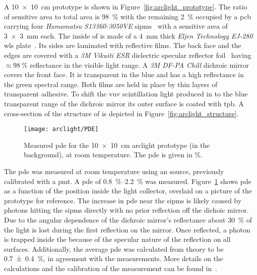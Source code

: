 A \SI{10 x 10}{\centi\metre} \AL{} prototype is shown in Figure~\ref{fig:arclight_prototype}.
The ratio of sensitive area to total area is \SI{98}{\percent} with the remaining \SI{2}{\percent} occupied by a \gls{pcb} carrying four \emph{Hamamatsu S13360-3050VE} \glspl{sipm}~\cite{arclight_sipm} with a sensitive area of \SI{3 x 3}{\milli\metre} each.
The inside of \AL{} is made of a \SI{4}{\milli\metre} thick \emph{Eljen Technology EJ-280} \gls{wls} plate~\cite{arclight_wls}.
Its sides are laminated with reflective films.
The back face and the edges are covered with a \emph{3M Vikuiti ESR} dielectric specular reflector foil~\cite{arclight_esr} having $\approx \SI{98}{\percent}$ reflectance in the visible light range.
A \emph{3M DF-PA Chill} dichroic mirror~\cite{arclight_dichroic} covers the front face.
It is transparent in the blue and has a high reflectance in the green spectral range.
Both films are held in place by thin layers of transparent adhesive.
To shift the \gls{vuv} scintillation light produced in \lar{} to the blue transparent range of the dichroic mirror its outer surface is coated with \gls{tpb}.
A cross-section of the structure of \AL{} is depicted in Figure~\ref{fig:arclight_structure}.

\begin{figure}[tbp]
	\centering
	\texttt{[image: arclight/PDE]}
	\caption[Measured  ]{%
		Measured \acrshort{pde} for the \SI{10 x 10}{\centi\metre} \acrshort{arclight} prototype (in the background), at room temperature.
		The \acrshort{pde} is given in \si{\percent}.
	}
	\label{fig:arclight_pde}
\end{figure}

The \gls{pde} was measured at room temperature using an  source, previously calibrated with a \gls{pmt}.
A \gls{pde} of \SIrange{0.8}{2.2}{\percent} was measured.
Figure~\ref{fig:arclight_pde} shows \gls{pde} as a function of the position inside the light collector, overlaid on a picture of the prototype for reference.
The increase in \gls{pde} near the \glspl{sipm} is likely caused by photons hitting the \glspl{sipm} directly with no prior reflection off the dichoic mirror.
Due to the angular dependence of the dichroic mirror's reflectance about \SI{30}{\percent} of the light is lost during the first reflection on the mirror.
Once reflected, a photon is trapped inside the \AL{} because of the specular nature of the reflection on all surfaces.
Additionally, the average \gls{pde} was calculated from theory to be \SI{0.7 +- 0.4}{\percent}, in agreement with the measurements.
More details on the calculations and the calibration of the measurement can be found in~\cite{arclight}.


